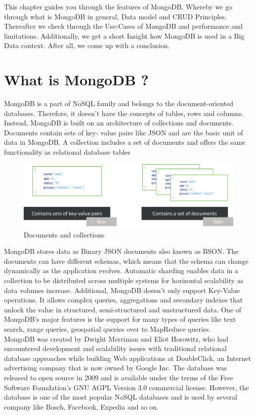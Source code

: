 This chapter guides you through the features of MongoDB. Whereby we go through what is MongoDB in general, Data model and CRUD Principles. Thereafter we check through the Use-Cases of MongoDB and performance and limitations. Additionally, we get a short Insight how MongoDB is used in a Big Data context. After all, we come up with a conclusion.

\section{What is MongoDB ?}
MongoDB is a part of NoSQL family and belongs to the document-oriented databases. Therefore, it doesn’t have the concepts of tables, rows and columns. Instead, MongoDB is built on an architecture of collections and documents. Documents contain sets of key- value pairs like JSON and are the basic unit of data in MongoDB. A collection includes a set of documents and offers the same functionality as relational database tables\cite{Banker2016}
\begin{figure}[H]
\includegraphics[width=\linewidth,keepaspectratio]{images/documentscollections.png}
\caption{Documents and collections}
\end{figure}

MongoDB stores data as Binary JSON documents also known as BSON. The documents can have different schemas, which means that the schema can change dynamically as the application evolves. Automatic sharding enables data in a collection to be distributed across multiple systems for horizontal scalability as data volumes increase\cite{Edward2015}. Additional, MongoDB doesn’t only support Key-Value operations. It allows complex queries, aggregations and secondary indexes that unlock the value in structured, semi-structured and unstructured data. One of MongoDB’s major features is the support for many types of queries like text search, range queries, geospatial queries over to MapReduce queries\cite{MongoDBInc.2013a}.
\\
MongoDB was created by Dwight Merriman and Eliot Horowitz, who had encountered development and scalability issues with traditional relational database approaches while building Web applications at DoubleClick, an Internet advertising company that is now owned by Google Inc. The database was released to open source in 2009 and is available under the terms of the Free Software Foundation's GNU AGPL Version 3.0 commercial license. However, the database is one of the most popular NoSQL databases and is used by several company like Bosch, Facebook, Expedia and so on\cite{Hows2013}.

